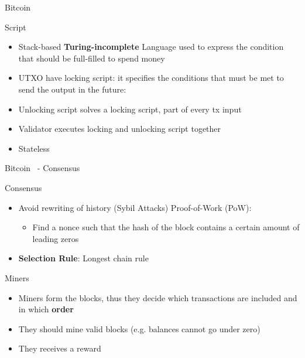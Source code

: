 \begin{frame}{Bitcoin~\cite{nakamoto2008bitcoin}}
\begin{block}{Script}
    \begin{itemize}
    \item Stack-based \textbf{Turing-incomplete} Language used to express the 
    condition that should be full-filled to spend money
    \item UTXO have locking script: it specifies the conditions that must be met to send the output in the future:
    \item Unlocking script solves a locking script, part of every tx input
    \item Validator executes locking and unlocking script together
    \item Stateless
    \end{itemize}
	\end{block}
\end{frame}


\begin{frame}{Bitcoin~\cite{nakamoto2008bitcoin} - Consensus}

\begin{block}{Consensus}
  \begin{itemize}
  \item Avoid rewriting of history (Sybil Attacks) Proof-of-Work (PoW):
  \begin{itemize}
  \item Find a nonce such that the hash of the block contains a certain
  amount of leading zeros
  \end{itemize}
  \item \textbf{Selection Rule}: Longest chain rule
  \end{itemize}
\end{block}

\begin{block}{Miners}
\begin{itemize}
\item Miners form the blocks, thus they decide which
      transactions are included and in which \textbf{order}
\item They should mine valid blocks (e.g. balances cannot go under zero)
\item They receives a reward
\end{itemize}
\end{block}

\end{frame}